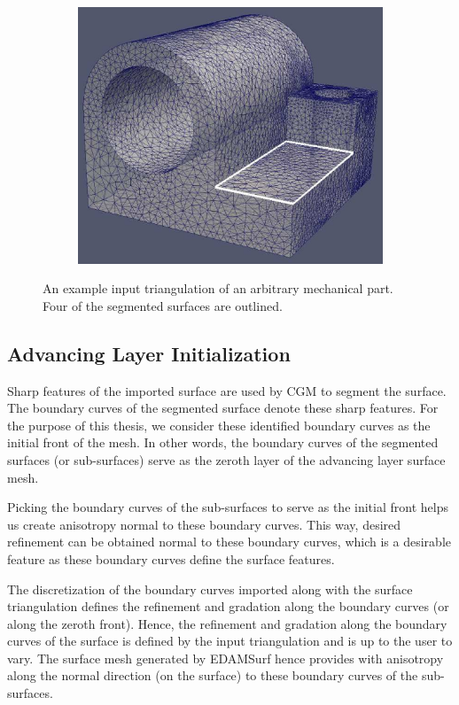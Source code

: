 \begin{figure}
\begin{subfigure}{.5\textwidth}
  \caption{}
  \label{surf2}
\end{subfigure}%
\begin{subfigure}{.5\textwidth}
  \centering
  \includegraphics[width=.8\linewidth]{img/m1/surfSegmentation/surf7.eps}
  \caption{}
  \label{surf3}
\end{subfigure}
\caption{An example input triangulation of an arbitrary mechanical part. Four of the segmented surfaces are outlined.}
\label{fig-surfSegment}
\end{figure}

\subsection{Advancing Layer Initialization}

Sharp features of the imported surface are used by CGM to segment the surface. The boundary curves of the segmented surface denote these sharp features. For the purpose of this thesis, we consider these identified boundary curves as the initial front of the mesh. In other words, the boundary curves of the segmented surfaces (or sub-surfaces) serve as the zeroth layer of the advancing layer surface mesh.

Picking the boundary curves of the sub-surfaces to serve as the initial front helps us create anisotropy normal to these boundary curves. This way, desired refinement can be obtained normal to these boundary curves, which is a desirable feature as these boundary curves define the surface features.

The discretization of the boundary curves imported along with the surface triangulation defines the refinement and gradation along the boundary curves (or along the zeroth front). Hence, the refinement and gradation along the boundary curves of the surface is defined by the input triangulation and is up to the user to vary. The surface mesh generated by EDAMSurf hence provides with anisotropy along the normal direction (on the surface) to these boundary curves of the sub-surfaces.

